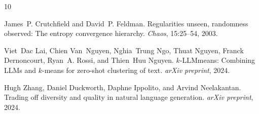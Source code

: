 \documentclass[11pt]{article}
\begin{document}
\begin{thebibliography}{10}

James~P. Crutchfield and David~P. Feldman.
\newblock Regularities unseen, randomness observed: The entropy convergence
  hierarchy.
\newblock \emph{Chaos}, 15:25--54, 2003.

Viet~Dac Lai, Chien Van~Nguyen, Nghia~Trung Ngo, Thuat Nguyen, Franck Dernoncourt, Ryan~A. Rossi, and Thien~Huu Nguyen.
\newblock $k$-LLMmeans: Combining LLMs and $k$-means for zero-shot clustering of text.
\newblock \emph{arXiv preprint}, 2024.

Hugh Zhang, Daniel Duckworth, Daphne Ippolito, and Arvind Neelakantan.
\newblock Trading off diversity and quality in natural language generation.
\newblock \emph{arXiv preprint}, 2024.

\end{thebibliography}
\end{document}
